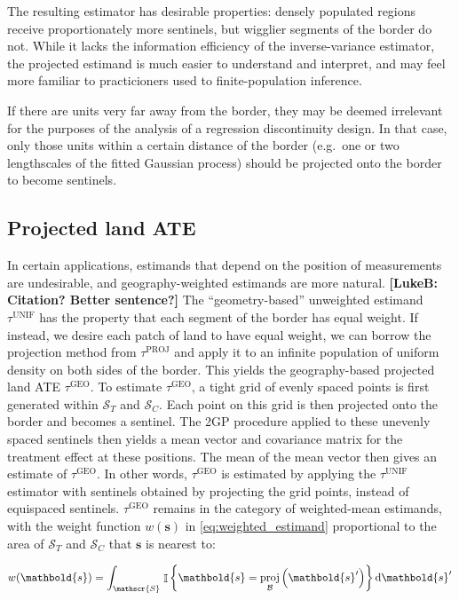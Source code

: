 \documentclass[letter]{article}
\DeclareMathOperator{\Ind}{\mathbb{I}}
\newcommand{\scrS}{\mathscr{S}}
\newcommand{\svec}{\mathbold{s}}
\newcommand{\boundary}{\mathcal{B}}
\newcommand{\unifavg}{\tau^{\mathrm{UNIF}}}
\newcommand{\tauproj}{\tau^{\mathrm{PROJ}}}
\newcommand{\taugeo}{\tau^{\mathrm{GEO}}}
\DeclareMathOperator{\proj}{proj}
\begin{document}
The resulting estimator has desirable properties: densely populated regions receive proportionately more sentinels, but wigglier segments of the border do not.
While it lacks the information efficiency of the inverse-variance estimator,
the projected estimand is much easier to understand and interpret,
and may feel more familiar to practicioners used to finite-population inference.

If there are units very far away from the border,
they may be deemed irrelevant for the purposes of the analysis of a regression discontinuity design. In that case, only those units within a certain distance of the border (e.g.~one or two lengthscales of the fitted Gaussian process) should be projected onto the border to become sentinels.
    


    	\subsection{Projected land ATE}\label{projected-land-ate}

In certain applications, estimands that depend on the position of measurements are undesirable, and geography-weighted estimands are more natural. \textbf{{[}LukeB: Citation? Better sentence?{]}}
The ``geometry-based'' unweighted estimand \(\unifavg\) has the property that each segment of the border has equal weight.
If instead, we desire each patch of land to have equal weight, we can borrow the projection method from \(\tauproj\) and apply it to an infinite population of uniform density on both sides of the border.
This yields the geography-based projected land ATE \(\taugeo\).
To estimate \(\taugeo\), a tight grid of evenly spaced points is first generated within \(\scrS_T\) and \(\scrS_C\).
Each point on this grid is then projected onto the border and becomes a sentinel.
The 2GP procedure applied to these unevenly spaced sentinels then yields a mean vector and covariance matrix for the treatment effect at these positions.
The mean of the mean vector then gives an estimate of \(\taugeo\).
In other words, \(\taugeo\) is estimated by applying the \(\unifavg\) estimator with sentinels obtained by projecting the grid points, instead of equispaced sentinels.
\(\taugeo\) remains in the category of weighted-mean estimands, with the weight function \(w(\svec)\) in \eqref{eq:weighted_estimand} proportional to the area of \(\scrS_T\) and \(\scrS_C\) that \(\svec\) is nearest to:

\begin{equation}
w(\svec) = \int_{\scrS} \left. \Ind \cbr{\svec = \proj_{\boundary}\del{\svec'}} \dif \svec' \right.
\end{equation}
\end{document}
